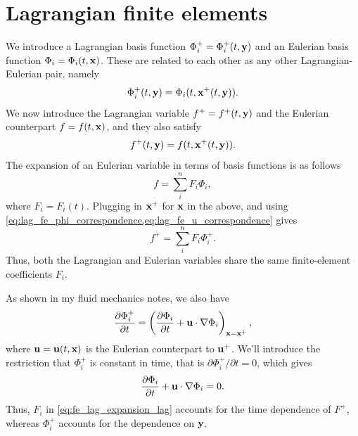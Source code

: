 \documentclass[11pt]{report}
\begin{document}
\section{Lagrangian finite elements}
\label{sec:lag_fin_elem}
We introduce a Lagrangian basis function $\Phi_i^+ = \Phi_i^+(t,\mathbf{y})$ and an Eulerian basis function $\Phi_i = \Phi_i(t,\mathbf{x})$. These are related to each other as any other Lagrangian-Eulerian pair, namely 
\begin{equation}
    \label{eq:lag_fe_phi_correspondence}
    \Phi_i^+(t,\mathbf{y}) = \Phi_i(t,\mathbf{x}^+(t,\mathbf{y})).
\end{equation}
We now introduce the Lagrangian variable $f^+ = f^+(t,\mathbf{y})$ and the Eulerian counterpart $f = f(t,\mathbf{x})$, and they also satisfy
\begin{equation}
    \label{eq:lag_fe_u_correspondence}
    f^+(t,\mathbf{y}) = f(t,\mathbf{x}^+(t,\mathbf{y})).
\end{equation}
The expansion of an Eulerian variable in terms of basis functions is as follows
\begin{equation}
    \label{eq:lag_fe_expansion_eul}
    f = \sum_i^n F_i \Phi_i,
\end{equation}
where $F_i = F_i(t)$. Plugging in $\mathbf{x}^+$ for $\mathbf{x}$ in the above, and using \cref{eq:lag_fe_phi_correspondence,eq:lag_fe_u_correspondence} gives
\begin{equation}
    \label{eq:fe_lag_expansion_lag}
    f^+ = \sum_i^n F_i \Phi_i^+.
\end{equation}
Thus, both the Lagrangian and Eulerian variables share the same finite-element coefficients $F_i$. 

As shown in my fluid mechanics notes, we also have
\begin{equation}
    \label{eq:lag_fe_deriv_correspondence}
    \frac{\partial \Phi_i^+}{\partial t} = \left ( \frac{\partial \Phi_i}{\partial t} + \mathbf{u} \cdot \nabla \Phi_i \right )_{\mathbf{x} = \mathbf{x}^+},
\end{equation}
where $\mathbf{u} = \mathbf{u}(t,\mathbf{x})$ is the Eulerian counterpart to $\mathbf{u}^+$. We'll introduce the restriction that $\Phi_i^+$ is constant in time, that is $\partial \Phi_i^+/\partial t = 0$, which gives
\begin{equation}
    \frac{\partial \Phi_i}{\partial t} + \mathbf{u} \cdot \nabla \Phi_i = 0.
\end{equation}
Thus, $F_i$ in \cref{eq:fe_lag_expansion_lag} accounts for the time dependence of $F^+$, whereas $\Phi_i^+$ accounts for the dependence on $\mathbf{y}$.
\end{document}
